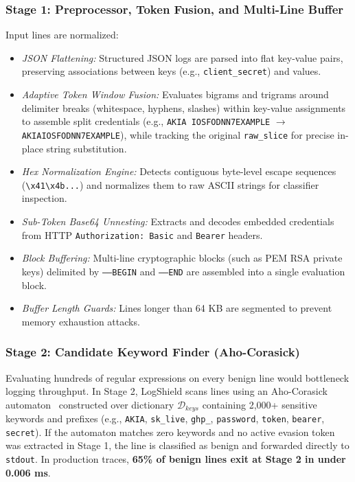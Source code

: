 \documentclass[conference]{IEEEtran}
\begin{document}
\subsubsection{Stage 1: Preprocessor, Token Fusion, and Multi-Line Buffer}
Input lines are normalized:
\begin{itemize}
    \item \textit{JSON Flattening:} Structured JSON logs are parsed into flat key-value pairs, preserving associations between keys (e.g., \texttt{client\_secret}) and values.
    \item \textit{Adaptive Token Window Fusion:} Evaluates bigrams and trigrams around delimiter breaks (whitespace, hyphens, slashes) within key-value assignments to assemble split credentials (e.g., \texttt{AKIA IOSFODNN7EXAMPLE} $\to$ \texttt{AKIAIOSFODNN7EXAMPLE}), while tracking the original \texttt{raw\_slice} for precise in-place string substitution.
    \item \textit{Hex Normalization Engine:} Detects contiguous byte-level escape sequences (\texttt{\textbackslash x41\textbackslash x4b...}) and normalizes them to raw ASCII strings for classifier inspection.
    \item \textit{Sub-Token Base64 Unnesting:} Extracts and decodes embedded credentials from HTTP \texttt{Authorization: Basic} and \texttt{Bearer} headers.
    \item \textit{Block Buffering:} Multi-line cryptographic blocks (such as PEM RSA private keys) delimited by \texttt{-----BEGIN} and \texttt{-----END} are assembled into a single evaluation block.
    \item \textit{Buffer Length Guards:} Lines longer than 64 KB are segmented to prevent memory exhaustion attacks.
\end{itemize}

\subsubsection{Stage 2: Candidate Keyword Finder (Aho-Corasick)}
Evaluating hundreds of regular expressions on every benign line would bottleneck logging throughput. In Stage 2, LogShield scans lines using an Aho-Corasick automaton~\cite{aho1975efficient} constructed over dictionary $\mathcal{D}_{keys}$ containing 2,000+ sensitive keywords and prefixes (e.g., \texttt{AKIA}, \texttt{sk\_live}, \texttt{ghp\_}, \texttt{password}, \texttt{token}, \texttt{bearer}, \texttt{secret}). 
If the automaton matches zero keywords and no active evasion token was extracted in Stage 1, the line is classified as benign and forwarded directly to \texttt{stdout}. In production traces, \textbf{65\% of benign lines exit at Stage 2 in under 0.006 ms}.
\end{document}
